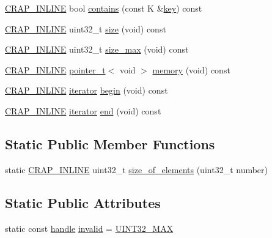 \begin{DoxyCompactItemize}
\item 
\hyperlink{config__x86_8h_a5a40526b8d842e7ff731509998bb0f1c}{C\+R\+A\+P\+\_\+\+I\+N\+L\+I\+N\+E} bool \hyperlink{classcrap_1_1linear__map_ac6ad8d8c1e75bcaf73988d99e584cfb8}{contains} (const K \&\hyperlink{classcrap_1_1linear__map_a710c4784756c34edffaba22d614a0af0}{key}) const 
\item 
\hyperlink{config__x86_8h_a5a40526b8d842e7ff731509998bb0f1c}{C\+R\+A\+P\+\_\+\+I\+N\+L\+I\+N\+E} uint32\+\_\+t \hyperlink{classcrap_1_1linear__map_ab2b37254485aa0632b669d02e5191133}{size} (void) const 
\item 
\hyperlink{config__x86_8h_a5a40526b8d842e7ff731509998bb0f1c}{C\+R\+A\+P\+\_\+\+I\+N\+L\+I\+N\+E} uint32\+\_\+t \hyperlink{classcrap_1_1linear__map_afdeaccc120d463c32198db34e7c27afe}{size\+\_\+max} (void) const 
\item 
\hyperlink{config__x86_8h_a5a40526b8d842e7ff731509998bb0f1c}{C\+R\+A\+P\+\_\+\+I\+N\+L\+I\+N\+E} \hyperlink{structcrap_1_1pointer__t}{pointer\+\_\+t}$<$ void $>$ \hyperlink{classcrap_1_1linear__map_aa31b5e69f000c0ebceb923addfc37697}{memory} (void) const 
\item 
\hyperlink{config__x86_8h_a5a40526b8d842e7ff731509998bb0f1c}{C\+R\+A\+P\+\_\+\+I\+N\+L\+I\+N\+E} \hyperlink{structcrap_1_1linear__map_1_1iterator}{iterator} \hyperlink{classcrap_1_1linear__map_ae69e9149dba703639acda486bed2b06f}{begin} (void) const 
\item 
\hyperlink{config__x86_8h_a5a40526b8d842e7ff731509998bb0f1c}{C\+R\+A\+P\+\_\+\+I\+N\+L\+I\+N\+E} \hyperlink{structcrap_1_1linear__map_1_1iterator}{iterator} \hyperlink{classcrap_1_1linear__map_a30b07809d568128b588a1f67cb501bfc}{end} (void) const 
\end{DoxyCompactItemize}
\subsection*{Static Public Member Functions}
\begin{DoxyCompactItemize}
\item 
static \hyperlink{config__x86_8h_a5a40526b8d842e7ff731509998bb0f1c}{C\+R\+A\+P\+\_\+\+I\+N\+L\+I\+N\+E} uint32\+\_\+t \hyperlink{classcrap_1_1linear__map_aaf8459292dd9138b928278187f709c7b}{size\+\_\+of\+\_\+elements} (uint32\+\_\+t number)
\end{DoxyCompactItemize}
\subsection*{Static Public Attributes}
\begin{DoxyCompactItemize}
\item 
static const \hyperlink{classcrap_1_1linear__map_af77a9e092bd3ffb9557327bd3082e47f}{handle} \hyperlink{classcrap_1_1linear__map_a6d22362f376b8631f2a9683939aeea26}{invalid} = \hyperlink{crap__types_8h_ab5eb23180f7cc12b7d6c04a8ec067fdd}{U\+I\+N\+T32\+\_\+\+M\+A\+X}
\end{DoxyCompactItemize}


